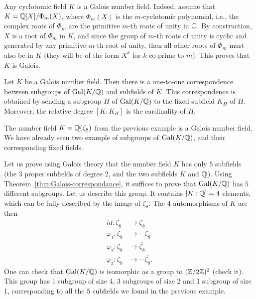 \begin{example}
Any cyclotomic field $K$ is a Galois number field. Indeed, assume that $K = \mathbb{Q}[X]/\Phi_m(X)$, where $\Phi_m(X)$ is the $m$-cyclotomic polynomial, i.e., the complex roots of $\Phi_m$ are the primitive $m$-th roots of unity in $\mathbb{C}$. By construction, $X$ is a root of $\Phi_m$ in $K$, and since the group of $m$-th roots of unity is cyclic and generated by any primitive $m$-th root of unity, then all other roots of $\Phi_m$ must also be in $K$ (they will be of the form $X^k$ for $k$ co-prime to $m$). This proves that $K$ is Galois.
\end{example}

\begin{theorem}
\label{thm:Galois-correspondance}
Let $K$ be a Galois number field. Then there is a one-to-one correspondence between subgroups of $\operatorname{Gal}(K/\mathbb{Q})$ and subfields of $K$. This correspondence is obtained by sending a subgroup $H$ of $\operatorname{Gal}(K/\mathbb{Q})$ to the fixed subfield $K_H$ of $H$. Moreover, the relative degree $[K:K_H]$ is the cardinality of $H$.
\end{theorem}

\begin{example}
The number field $K = \mathbb{Q}(\zeta_8)$ from the previous example is a Galois number field. We have already seen two example of subgroups of $\operatorname{Gal}(K/\mathbb{Q})$, and their corresponding fixed fields.

Let us prove using Galois theory that the number field $K$ has only $5$ subfields (the $3$ proper subfields of degree $2$, and the two subfields $K$ and $\mathbb{Q}$). Using Theorem~\ref{thm:Galois-correspondance}, it suffices to prove that $\operatorname{Gal}(K/\mathbb{Q})$ has $5$ different subgroups. Let us describe this group. It contains $[K:\mathbb{Q}] = 4$ elements, which can be fully described by the image of $\zeta_8$. The $4$ automorphisms of $K$ are then
\begin{align*}
id: \zeta_8 &\rightarrow \zeta_8 \\
\varphi_1: \zeta_8 &\rightarrow -\zeta_8 \\
\varphi_2: \zeta_8 &\rightarrow \overline{\zeta_8} \\
\varphi_3: \zeta_8 &\rightarrow -\overline{\zeta_8}.
\end{align*}
One can check that $\operatorname{Gal}(K/\mathbb{Q})$ is isomorphic as a group to $(\mathbb{Z}/2\mathbb{Z})^2$ (check it). This group has 1 subgroup of size 4, 3 subgroups of size 2 and 1 subgroup of size 1, corresponding to all the $5$ subfields we found in the previous example.
\end{example}


